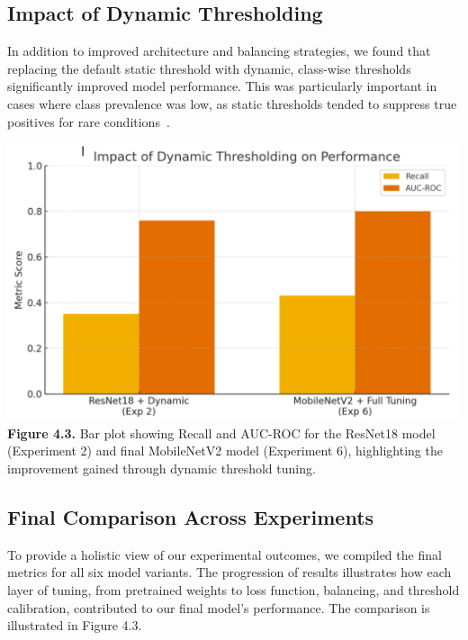 \documentclass[12pt]{article}
\begin{document}
\begin{multicols}{2}
\subsection{Impact of Dynamic Thresholding}

In addition to improved architecture and balancing strategies, we found that replacing the default static threshold with dynamic, class-wise thresholds significantly improved model performance. This was particularly important in cases where class prevalence was low, as static thresholds tended to suppress true positives for rare conditions~\cite{12}.

\begin{center}
    \includegraphics[width=\linewidth]{figure4.3.png}
    \textbf{Figure 4.3.} Bar plot showing Recall and AUC-ROC for the ResNet18 model (Experiment 2) and final MobileNetV2 model (Experiment 6), highlighting the improvement gained through dynamic threshold tuning.
\end{center}

\subsection{Final Comparison Across Experiments}

To provide a holistic view of our experimental outcomes, we compiled the final metrics for all six model variants. The progression of results illustrates how each layer of tuning, from pretrained weights to loss function, balancing, and threshold calibration, contributed to our final model's performance. The comparison is illustrated in Figure 4.3.


\end{multicols}
\end{document}
